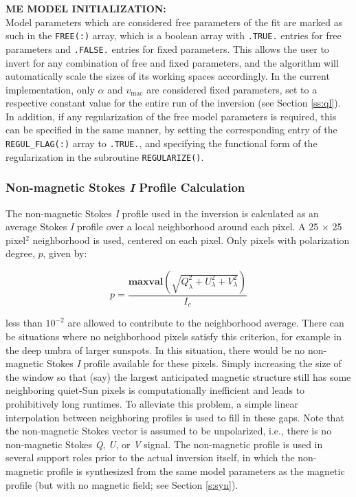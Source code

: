 \documentclass[11pt]{article}
\begin{document}
\textbf{ME MODEL INITIALIZATION:}\\
Model parameters which are considered free parameters of the fit are marked as
such in the \texttt{FREE(:)} array, which is a boolean array with \texttt{.TRUE.} entries
for free parameters and \texttt{.FALSE.} entries for fixed parameters.  This allows the user
to invert for any combination of free and fixed parameters, and the algorithm will automatically
scale the sizes of its working spaces accordingly.  In the current implementation, only $\alpha$
and $v_{\mathrm{mac}}$ are considered fixed parameters, set to a respective constant value for
the entire run of the inversion (see Section \ref{ss:ql}).  In addition, if any regularization
of the free model parameters is required, this can be specified in the same manner, by setting the
corresponding entry of the \texttt{REGUL\_FLAG(:)} array to \texttt{.TRUE.}, and specifying the 
functional form of the regularization in the subroutine \texttt{REGULARIZE()}.

\subsubsection{Non-magnetic Stokes \textit{I} Profile Calculation}\label{ss:nonmag}
The non-magnetic Stokes \textit{I} profile used in the inversion is calculated as an average Stokes
\textit{I} profile over a local neighborhood around each pixel.  A 25 $\times$ 25 pixel$^{2}$ neighborhood
is used, centered on each pixel.  Only pixels with polarization degree, $p$, given by:

\begin{equation}
p = \frac{\mathrm{\mathbf{maxval}}\left(\sqrt{Q_{\lambda}^2 + U_{\lambda}^2 + V_{\lambda}^2}\right)}{I_{c}}
\end{equation}

less than $10^{-2}$ are allowed to contribute to the neighborhood average.  There can be situations where no
neighborhood pixels satisfy this criterion, for example in the deep umbra of larger sunspots.
In this situation, there would be no non-magnetic Stokes \textit{I} profile available for these pixels.
Simply increasing the size of the window so that (say) the largest anticipated magnetic structure
still has some neighboring quiet-Sun pixels is computationally inefficient and leads to prohibitively
long runtimes.  To alleviate this problem, a simple linear interpolation between neighboring profiles
is used to fill in these gaps.  Note that the non-magnetic Stokes vector is assumed to be unpolarized,
i.e., there is no non-magnetic Stokes \textit{Q}, \textit{U}, or \textit{V} signal.  The non-magnetic
profile is used in several support roles prior to the actual inversion itself, in which the non-magnetic
profile is synthesized from the same model parameters as the magnetic profile (but with no magnetic
field; see Section \ref{s:syn}).
\end{document}
